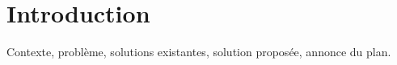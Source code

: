 
\chapter{Introduction} %
\label{chapter_introduction}

\cite{messiarima}


Contexte, problème, solutions existantes, solution proposée, annonce du plan. 
